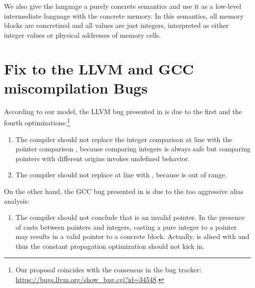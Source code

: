 We also give the language a purely concrete semantics and use it as a
low-level intermediate language with the concrete memory.  In this
semantics, all memory blocks are concretized and all values are just
integers, interpreted as either integer values or physical addresses
of memory cells.




\section{Fix to the LLVM and GCC miscompilation Bugs}
\label{sec:intptrcast:fix}

According to our model, the LLVM bug presented in  is due to the first
and the fourth optimizations:\footnote{Our proposal coincides with the consensus in the bug tracker:
  \url{https://bugs.llvm.org/show_bug.cgi?id=34548}.}
\begin{enumerate}
\item[1.] The compiler should not replace the integer comparison  at line 
  with the pointer comparison , because comparing integers is always safe but
  comparing pointers with different origins invokes undefined behavior.
\item[4.] The compiler should not replace  at line  with , because
   is out of range.
\end{enumerate}

On the other hand, the GCC bug presented in  is due to the too
aggressive alias analysis:
\begin{enumerate}
\item[2.] The compiler should not conclude that  is an invalid pointer.  In the presence of
  casts between pointers and integers, casting a pure integer to a pointer may results in a valid
  pointer to a concrete block.  Actually,  is alised with  and thus the constant
  propagation optimization should not kick in.
\end{enumerate}


